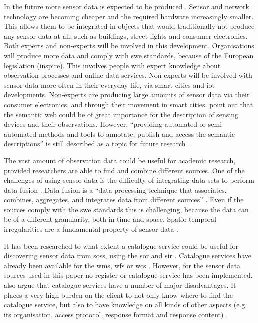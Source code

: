 In the future more sensor data is expected to be produced \citep{IoT:PWC}. Sensor and network technology are becoming cheaper and the required hardware increasingly smaller. This allows them to be integrated in objects that would traditionally not produce any sensor data at all, such as buildings, street lights and consumer electronics. Both experts and non-experts will be involved in this development. Organisations will produce more data and comply with \ac{swe} standards, because of the European legislation (\ac{inspire}). This involves people with expert knowledge about observation processes and online data services. Non-experts will be involved with sensor data more often in their everyday life, via smart cities and \ac{iot} developments. Non-experts are producing large amounts of sensor data via their consumer electronics, and through their movement in smart cities. \cite{IOT:Barnaghi} point out that the semantic web could be of great importance for the description of sensing devices and their observations. However, \enquote{providing automated or semi-automated methods and tools to annotate, publish and access the semantic descriptions} is still described as a topic for future research \cite[p. 19]{IOT:Barnaghi}. 

The vast amount of observation data could be useful for academic research, provided researchers are able to find and combine different sources. One of the challenges of using sensor data is the difficulty of integrating data sets to perform data fusion \citep{SSW:Corcho, SSW:Ji, SSW:Wang}. Data fusion is a \enquote{data processing technique that associates, combines, aggregates, and integrates data from different sources} \cite[p. 2]{SSW:Wang2}. Even if the sources comply with the \ac{swe} standards this is challenging, because the data can be of a different granularity, both in time and space. Spatio-temporal irregularities are a fundamental property of sensor data \citep{SW:Ganesan}. 

It has been researched to what extent a catalogue service could be useful for discovering sensor data from \aclp{sos}, using the \ac{sor} \citep{SW:OGC4} and \ac{sir} \citep{SW:OGC3}. Catalogue services have already been available for the \ac{wms}, \ac{wfs} or \ac{wcs} \citep{SDI:OGC2}. However, for the sensor data sources used in this paper no register or catalogue service has been implemented. \cite{SSW:Atkinson} also argue that catalogue services have a number of major disadvantages. It places a very high burden on the client to not only know where to find the catalogue service, but also to have knowledge on all kinds of other aspects (e.g. its organisation, access protocol, response format and response content) \cite[p. 128]{SSW:Atkinson}. 

